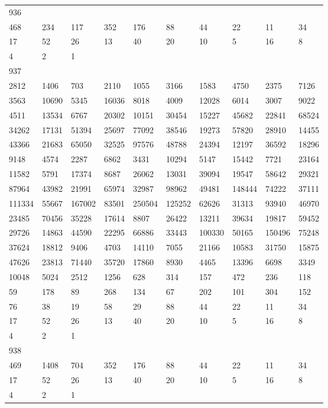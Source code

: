 \begin{longtable}{*{10}{l}}
936&&&&&&&&&\\
468& 234& 117& 352& 176& 88& 44& 22& 11& 34\\
17& 52& 26& 13& 40& 20& 10& 5& 16& 8\\
4& 2& 1& \\

937&&&&&&&&&\\
2812& 1406& 703& 2110& 1055& 3166& 1583& 4750& 2375& 7126\\
3563& 10690& 5345& 16036& 8018& 4009& 12028& 6014& 3007& 9022\\
4511& 13534& 6767& 20302& 10151& 30454& 15227& 45682& 22841& 68524\\
34262& 17131& 51394& 25697& 77092& 38546& 19273& 57820& 28910& 14455\\
43366& 21683& 65050& 32525& 97576& 48788& 24394& 12197& 36592& 18296\\
9148& 4574& 2287& 6862& 3431& 10294& 5147& 15442& 7721& 23164\\
11582& 5791& 17374& 8687& 26062& 13031& 39094& 19547& 58642& 29321\\
87964& 43982& 21991& 65974& 32987& 98962& 49481& 148444& 74222& 37111\\
111334& 55667& 167002& 83501& 250504& 125252& 62626& 31313& 93940& 46970\\
23485& 70456& 35228& 17614& 8807& 26422& 13211& 39634& 19817& 59452\\
29726& 14863& 44590& 22295& 66886& 33443& 100330& 50165& 150496& 75248\\
37624& 18812& 9406& 4703& 14110& 7055& 21166& 10583& 31750& 15875\\
47626& 23813& 71440& 35720& 17860& 8930& 4465& 13396& 6698& 3349\\
10048& 5024& 2512& 1256& 628& 314& 157& 472& 236& 118\\
59& 178& 89& 268& 134& 67& 202& 101& 304& 152\\
76& 38& 19& 58& 29& 88& 44& 22& 11& 34\\
17& 52& 26& 13& 40& 20& 10& 5& 16& 8\\
4& 2& 1& \\

938&&&&&&&&&\\
469& 1408& 704& 352& 176& 88& 44& 22& 11& 34\\
17& 52& 26& 13& 40& 20& 10& 5& 16& 8\\
4& 2& 1& \\


\end{longtable}
